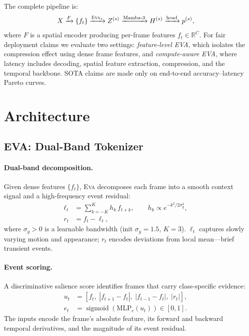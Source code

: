 \documentclass[10pt,twocolumn]{article}
\newcommand{\EVA}{\textsc{Eva}}
\begin{document}
The complete pipeline is:
\[
    X \xrightarrow{F} \{f_t\} \xrightarrow{\EVA_s} Z^{(s)}
      \xrightarrow{\text{Mamba-3}} H^{(s)} \xrightarrow{\text{head}} p^{(s)},
\]
where $F$ is a spatial encoder producing per-frame features $f_t \in \mathbb{R}^C$.
For fair deployment claims we evaluate two settings: \emph{feature-level EVA},
which isolates the compression effect using dense frame features, and
\emph{compute-aware EVA}, where latency includes decoding, spatial feature
extraction, compression, and the temporal backbone. SOTA claims are made only on
end-to-end accuracy--latency Pareto curves.

\section{Architecture}
\label{sec:arch}

\subsection{EVA: Dual-Band Tokenizer}

\paragraph{Dual-band decomposition.}
Given dense features $\{f_t\}$, \EVA{} decomposes each frame into a smooth
context signal and a high-frequency event residual:
\begin{align}
    \ell_t &= \sum_{k=-K}^{K} h_k\, f_{t+k}, \qquad
             h_k \propto e^{-k^2/2\sigma_g^2}, \\
    r_t &= f_t - \ell_t,
\end{align}
where $\sigma_g > 0$ is a learnable bandwidth (init $\sigma_g{=}1.5$, $K{=}3$).
$\ell_t$ captures slowly varying motion and appearance; $r_t$ encodes
deviations from local mean---brief transient events.

\paragraph{Event scoring.}
A discriminative salience score identifies frames that carry class-specific
evidence:
\begin{align}
    u_t &= [f_t,\; |f_{t+1}-f_t|,\; |f_{t-1}-f_t|,\; |r_t|], \\
    e_t &= \operatorname{sigmoid}\!\left(\mathrm{MLP}_e(u_t)\right) \in [0,1].
\end{align}
The inputs encode the frame's absolute feature, its forward and backward
temporal derivatives, and the magnitude of its event residual.
\end{document}
